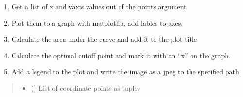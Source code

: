 \documentclass[letterpaper,10pt,english]{sphinxmanual}
\begin{document}
{{{{\begin{fulllineitems}
\label{\detokenize{mkloanpy:ronataswestoldturkiccommands.plot_eval.plot_curve}}
\pysigstartsignatures
{}
\pysigstopsignatures\begin{enumerate}
%
\item {} 
\sphinxAtStartPar
Get a list of x\sphinxhyphen{} and y\sphinxhyphen{}axis values out of the points argument

\item {} 
\sphinxAtStartPar
Plot them to a graph with matplotlib, add lables to axes.

\item {} 
\sphinxAtStartPar
Calculate the area under the curve and add it to the plot title

\item {} 
\sphinxAtStartPar
Calculate the optimal cut\sphinxhyphen{}off point and mark it with an “x” on the
graph.

\item {} 
\sphinxAtStartPar
Add a legend to the plot and write the image as a jpeg to the specified
path

\end{enumerate}
\begin{quote}\begin{description}
\begin{itemize}
\item {} 
\sphinxAtStartPar
{} () \textendash{} List of coordinate points as tuples


\end{itemize}
\end{description}
\end{quote}
\end{fulllineitems}}}}}
\end{document}
